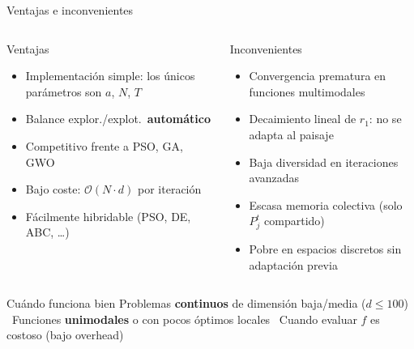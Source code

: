 \documentclass[aspectratio=169, spanish]{beamer}
\newcommand{\hl} [1]{\textcolor{myblue}  {\textbf{#1}}}
\begin{document}
\begin{frame}{Ventajas e inconvenientes}
  \begin{columns}[T, onlytextwidth]
      \begin{exampleblock}{{Ventajas}}
        \begin{itemize}
          \setlength\itemsep{0.35em}
          \item Implementación simple: los únicos parámetros son $a$, $N$, $T$
          \item Balance explor./explot.\ \textbf{automático}
          \item Competitivo frente a PSO, GA, GWO
          \item Bajo coste: $\mathcal{O}(N \cdot d)$ por iteración
          \item Fácilmente hibridable (PSO, DE, ABC, \ldots)
        \end{itemize}
      \end{exampleblock}

      \begin{alertblock}{{Inconvenientes}}
        \begin{itemize}
          \setlength\itemsep{0.35em}
          \item Convergencia prematura en funciones multimodales
          \item Decaimiento lineal de $r_1$: no se adapta al paisaje
          \item Baja diversidad en iteraciones avanzadas
          \item Escasa memoria colectiva (solo $P_j^t$ compartido)
          \item Pobre en espacios discretos sin adaptación previa
        \end{itemize}
      \end{alertblock}
  \end{columns}

  \vspace{0.5em}
  \begin{block}{Cuándo funciona bien}
    Problemas \hl{continuos} de dimensión baja/media ($d \leq 100$) \textbullet\
    Funciones \hl{unimodales} o con pocos óptimos locales \textbullet\
    Cuando evaluar $f$ es costoso (bajo overhead)
  \end{block}
\end{frame}
\end{document}
